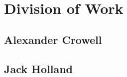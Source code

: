 \documentclass[journal]{IEEEtran}
\begin{document}
%
%


%




\appendices
\section{Division of Work}
\subsection{Alexander Crowell}
\subsection{Jack Holland}
\end{document}
